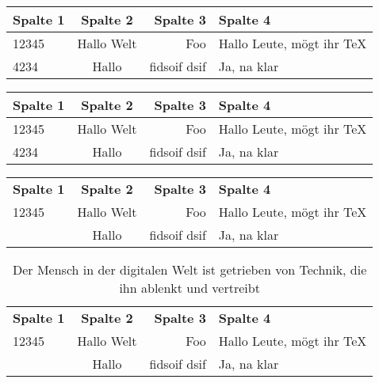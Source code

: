\documentclass[12pt,ngerman]{scrartcl}
\begin{document}
\listoftables

\clearpage

\begin{tabular}{|l|c|r|p{5cm}|} \hline
Spalte 1 & Spalte 2 & Spalte 3 & Spalte 4 \\ \hline
12345 & Hallo Welt & Foo & Hallo Leute, mögt ihr TeX \\ \hline
4234  & Hallo & fidsoif dsif & Ja, na klar \\ \hline
\end{tabular}\vspace*{2cm}



\begin{tabular}{lcrp{5cm}} \toprule[3pt]
Spalte 1 & Spalte 2 & Spalte 3 & Spalte 4 \\ \midrule
12345 & Hallo Welt & Foo & Hallo Leute, mögt ihr TeX \\ \midrule
4234  & Hallo & fidsoif dsif & Ja, na klar \\ \bottomrule[3pt]
\end{tabular}\vspace*{2cm}



\begin{tabular}{lcrp{5cm}} \toprule[2pt]
\textbf{Spalte 1} & \textbf{Spalte 2} & \textbf{Spalte 3} & \textbf{Spalte 4} \\ \cmidrule[1pt](rl){1-4}
12345 & Hallo Welt & Foo & Hallo Leute, mögt ihr TeX \\ \cmidrule[1pt](rl){1-4}
\addlinespace[1.5em]
4234  & Hallo & fidsoif dsif & Ja, na klar \\ \bottomrule[2pt]
\end{tabular}


\begin{table}[h]
\begin{center}
\caption{Der Mensch in der digitalen Welt ist getrieben von Technik, die ihn ablenkt und vertreibt}\label{tab:tabelle1}

\begin{tabular}{lcrp{5cm}} \toprule[2pt]
\textbf{Spalte 1} & \textbf{Spalte 2} & \textbf{Spalte 3} & \textbf{Spalte 4} \\ \cmidrule[1pt](rl){1-4}
12345 & Hallo Welt & Foo & Hallo Leute, mögt ihr TeX \\ \cmidrule[1pt](rl){1-4}
\addlinespace[1.5em]
4234  & Hallo & fidsoif dsif & Ja, na klar \\ \bottomrule[2pt]
\end{tabular}

\end{center}
\end{table}
\end{document}
